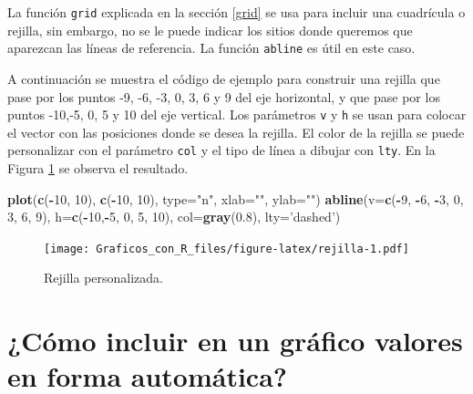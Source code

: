 \documentclass[10pt,]{krantz}
\makeatletter
\newenvironment{Shaded}{\begin{snugshade}}{\end{snugshade}}
\newcommand{\KeywordTok}[1]{\textcolor[rgb]{0.13,0.29,0.53}{\textbf{#1}}}
\newcommand{\DataTypeTok}[1]{\textcolor[rgb]{0.13,0.29,0.53}{#1}}
\newcommand{\DecValTok}[1]{\textcolor[rgb]{0.00,0.00,0.81}{#1}}
\newcommand{\FloatTok}[1]{\textcolor[rgb]{0.00,0.00,0.81}{#1}}
\newcommand{\StringTok}[1]{\textcolor[rgb]{0.31,0.60,0.02}{#1}}
\newcommand{\OperatorTok}[1]{\textcolor[rgb]{0.81,0.36,0.00}{\textbf{#1}}}
\newcommand{\NormalTok}[1]{#1}
\newenvironment{kframe}{%
\medskip{}
\setlength{\fboxsep}{.8em}
 \def\at@end@of@kframe{}%
 \ifinner\ifhmode%
  \def\at@end@of@kframe{\end{minipage}}%
  \begin{minipage}{\columnwidth}%
 \fi\fi%
 \def\FrameCommand##1{\hskip\@totalleftmargin \hskip-\fboxsep
 \colorbox{shadecolor}{##1}\hskip-\fboxsep
     \hskip-\linewidth \hskip-\@totalleftmargin \hskip\columnwidth}%
 \MakeFramed {\advance\hsize-\width
   \@totalleftmargin\z@ \linewidth\hsize
   \@setminipage}}%
 {\par\unskip\endMakeFramed%
 \at@end@of@kframe}
\renewenvironment{Shaded}{\begin{kframe}}{\end{kframe}}
\makeatother
\begin{document}
La función \texttt{grid} explicada en la sección \ref{grid} se usa para
incluir una cuadrícula o rejilla, sin embargo, no se le puede indicar
los sitios donde queremos que aparezcan las líneas de referencia. La
función \texttt{abline} es útil en este caso.

A continuación se muestra el código de ejemplo para construir una
rejilla que pase por los puntos -9, -6, -3, 0, 3, 6 y 9 del eje
horizontal, y que pase por los puntos -10,-5, 0, 5 y 10 del eje
vertical. Los parámetros \texttt{v} y \texttt{h} se usan para colocar el
vector con las posiciones donde se desea la rejilla. El color de la
rejilla se puede personalizar con el parámetro \texttt{col} y el tipo de
línea a dibujar con \texttt{lty}. En la Figura \ref{fig:rejilla} se
observa el resultado.

\begin{Shaded}
\begin{Highlighting}[]
\KeywordTok{plot}\NormalTok{(}\KeywordTok{c}\NormalTok{(}\OperatorTok{-}\DecValTok{10}\NormalTok{, }\DecValTok{10}\NormalTok{), }\KeywordTok{c}\NormalTok{(}\OperatorTok{-}\DecValTok{10}\NormalTok{, }\DecValTok{10}\NormalTok{), }\DataTypeTok{type=}\StringTok{"n"}\NormalTok{, }\DataTypeTok{xlab=}\StringTok{""}\NormalTok{, }\DataTypeTok{ylab=}\StringTok{""}\NormalTok{)}
\KeywordTok{abline}\NormalTok{(}\DataTypeTok{v=}\KeywordTok{c}\NormalTok{(}\OperatorTok{-}\DecValTok{9}\NormalTok{, }\OperatorTok{-}\DecValTok{6}\NormalTok{, }\OperatorTok{-}\DecValTok{3}\NormalTok{, }\DecValTok{0}\NormalTok{, }\DecValTok{3}\NormalTok{, }\DecValTok{6}\NormalTok{, }\DecValTok{9}\NormalTok{),}
       \DataTypeTok{h=}\KeywordTok{c}\NormalTok{(}\OperatorTok{-}\DecValTok{10}\NormalTok{,}\OperatorTok{-}\DecValTok{5}\NormalTok{, }\DecValTok{0}\NormalTok{, }\DecValTok{5}\NormalTok{, }\DecValTok{10}\NormalTok{), }\DataTypeTok{col=}\KeywordTok{gray}\NormalTok{(}\FloatTok{0.8}\NormalTok{), }\DataTypeTok{lty=}\StringTok{'dashed'}\NormalTok{)}
\end{Highlighting}
\end{Shaded}

\begin{figure}
\centering
\texttt{[image: Graficos\_con\_R\_files/figure-latex/rejilla-1.pdf]}
\caption{\label{fig:rejilla}Rejilla personalizada.}
\end{figure}

\section{¿Cómo incluir en un gráfico valores en forma
automática?}\label{como-incluir-en-un-grafico-valores-en-forma-automatica}
\end{document}
